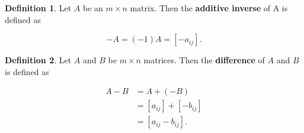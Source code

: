 \documentclass[12pt]{article}
\theoremstyle{definition}
\newtheorem*{definition}{Definition}
\begin{document}
\begin{definition}
Let $A$ be an $m \times n$ matrix. Then the \textbf{additive inverse} of A is defined as

\[
-A = (-1)A = [-a_{ij}].
\]
\end{definition}

\begin{definition}
Let $A$ and $B$ be $m \times n$ matrices. Then the \textbf{difference} of $A$ and $B$ is
defined as

\begin{align*}
A - B  &= A + (-B) \\
&= [a_{ij}] + [-b_{ij}] \\
&= [a_{ij} - b_{ij}].
\end{align*}
\end{definition}
\end{document}
